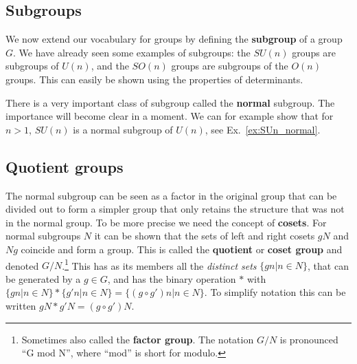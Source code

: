 \documentclass[notes.tex]{subfiles}
\begin{document}
\subsection{Subgroups}
We now extend our vocabulary for groups by defining the {\bf subgroup} of a group $G$.
We have already seen some examples of subgroups: the $SU(n)$ groups are subgroups of $U(n)$, and the $SO(n)$ groups are subgroups of the $O(n)$ groups. This can easily be shown using the properties of determinants.

There is a very important class of subgroup called the {\bf normal} subgroup. The importance will become clear in a moment.
We can for example show that for $n>1$, $SU(n)$ is a normal subgroup of $U(n)$, see Ex.~\ref{ex:SUn_normal}. 

\subsection{Quotient groups}
The normal subgroup can be seen as a factor in the original group that can be divided out to form a simpler group that only retains the structure that was not in the normal group. To be more precise we need the concept of {\bf cosets}. 
For normal subgroups $N$ it can be shown that the sets of left and right cosets $gN$ and $Ng$ coincide and form a group. This is called the {\bf quotient}  or {\bf coset group} and denoted $G/N$.\footnote{Sometimes also called the {\bf factor group}. The notation $G/N$ is pronounced ``G mod N'', where ``mod'' is short for modulo.}
This has as its members all the {\it distinct sets} $\{gn|n\in N\}$, that can be generated by a $g\in G$, and has the binary operation $*$ with $\{gn|n\in N\}*\{g'n|n\in N\}=\{ (g\circ g')n| n\in N\}$. To simplify notation this can be written $gN*g'N=(g\circ g') N$. 
 
\end{document}
